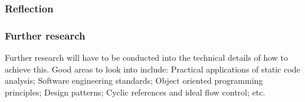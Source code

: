 \subsubsection{Reflection}

\subsubsection{Further research}
Further research will have to be conducted into the technical details of how to achieve this. Good areas to look into include: Practical applications of static code analysis; Software engineering standards; Object oriented programming principles; Design patterns; Cyclic references and ideal flow control; etc.
